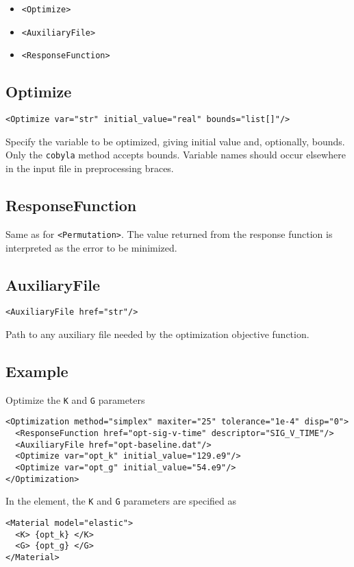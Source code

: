 \documentclass[11pt]{report}
\renewcommand{\tag}[1]{\texttt{<#1>}}
\newcommand{\reqdtag}[1]{\Red{\texttt{<#1>}}}
\begin{document}
\begin{itemize}
  \item \tag{Optimize}
  \item \tag{AuxiliaryFile}
  \item \tag{ResponseFunction}
\end{itemize}

\subsection{Optimize}
\begin{verbatim}
<Optimize var="str" initial_value="real" bounds="list[]"/>
\end{verbatim}
%
Specify the variable to be optimized, giving initial value and, optionally,
bounds.  Only the \texttt{cobyla} method accepts bounds.  Variable names should
occur elsewhere in the input file in preprocessing braces.

\subsection{ResponseFunction}
Same as for \tag{Permutation}.  The value returned from the response function
is interpreted as the error to be minimized.

\subsection{AuxiliaryFile}
\begin{verbatim}
<AuxiliaryFile href="str"/>
\end{verbatim}
Path to any auxiliary file needed by the optimization objective function.

\subsection{Example}
Optimize the \texttt{K} and \texttt{G} parameters
\begin{verbatim}
<Optimization method="simplex" maxiter="25" tolerance="1e-4" disp="0">
  <ResponseFunction href="opt-sig-v-time" descriptor="SIG_V_TIME"/>
  <AuxiliaryFile href="opt-baseline.dat"/>
  <Optimize var="opt_k" initial_value="129.e9"/>
  <Optimize var="opt_g" initial_value="54.e9"/>
</Optimization>
\end{verbatim}

In the \reqdtag{Material} element, the \texttt{K} and \texttt{G} parameters
are specified as
%
\begin{verbatim}
<Material model="elastic">
  <K> {opt_k} </K>
  <G> {opt_g} </G>
</Material>
\end{verbatim}
\end{document}
